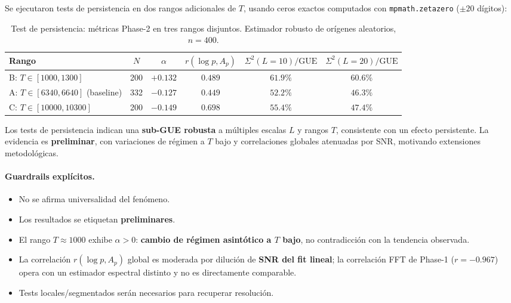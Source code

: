 \documentclass[12pt, a4paper]{article}
\begin{document}
Se ejecutaron tests de persistencia en dos rangos adicionales de $T$,
usando ceros exactos computados con \texttt{mpmath.zetazero} ($\pm 20$ dígitos):

\begin{table}[H]
\centering
\caption{Test de persistencia: métricas Phase-2 en tres rangos disjuntos.
         Estimador robusto de orígenes aleatorios, $n=400$.}
\begin{tabular}{lccccc}
\toprule
Rango & $N$ & $\alpha$ & $r(\log p, A_p)$ & $\Sigma^2(L=10)/\text{GUE}$ & $\Sigma^2(L=20)/\text{GUE}$ \\
\midrule
B: $T\in[1000,1300]$  & 200 & $+0.132$ & $0.489$ & $61.9\%$ & $60.6\%$ \\
A: $T\in[6340,6640]$ (baseline) & 332 & $-0.127$ & $0.449$ & $52.2\%$ & $46.3\%$ \\
C: $T\in[10000,10300]$ & 200 & $-0.149$ & $0.698$ & $55.4\%$ & $47.4\%$ \\
\bottomrule
\end{tabular}
\label{tab:persistencia}
\end{table}

Los tests de persistencia indican una \textbf{sub-GUE robusta} a múltiples
escalas $L$ y rangos $T$, consistente con un efecto persistente.
La evidencia es \textbf{preliminar}, con variaciones de régimen a $T$
bajo y correlaciones globales atenuadas por SNR,
motivando extensiones metodológicas.

\paragraph{Guardrails explícitos.}
\begin{itemize}
  \item No se afirma universalidad del fenómeno.
  \item Los resultados se etiquetan \textbf{preliminares}.
  \item El rango $T\approx 1000$ exhibe $\alpha > 0$: \textbf{cambio de régimen
        asintótico a $T$ bajo}, no contradicción con la tendencia observada.
  \item La correlación $r(\log p, A_p)$ global es moderada por dilución de
        \textbf{SNR del fit lineal}; la correlación FFT de Phase-1 ($r=-0.967$)
        opera con un estimador espectral distinto y no es directamente comparable.
  \item Tests locales/segmentados serán necesarios para recuperar resolución.
\end{itemize}
\end{document}
